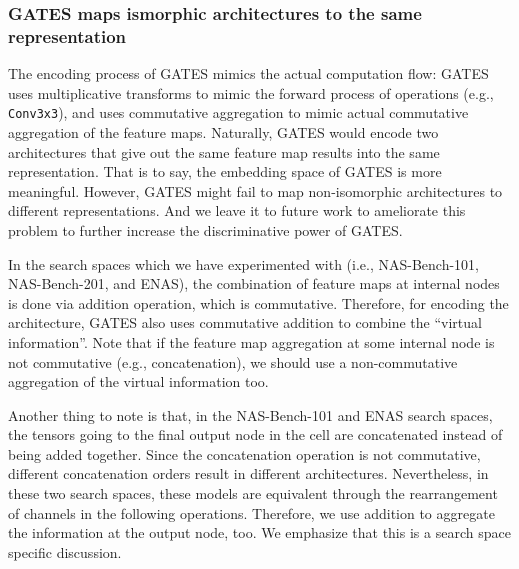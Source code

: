 \subsubsection{GATES maps ismorphic architectures to the same representation}
The encoding process of GATES mimics the actual computation flow: GATES uses multiplicative transforms to mimic the forward process of operations (e.g., \texttt{Conv3x3}), and uses commutative aggregation to mimic actual commutative aggregation of the feature maps.
Naturally, GATES would encode two architectures that give out the same feature map results into the same representation. That is to say, the embedding space of GATES is more meaningful. However, GATES might fail to map non-isomorphic architectures to different representations. And we leave it to future work to ameliorate this problem to further increase the discriminative power of GATES.

In the search spaces which we have experimented with (i.e., NAS-Bench-101, NAS-Bench-201, and ENAS), the combination of feature maps at internal nodes is done via addition operation, which is commutative. Therefore, for encoding the architecture, GATES also uses commutative addition to combine the ``virtual information''.
Note that if the feature map aggregation at some internal node is not commutative (e.g., concatenation), we should use a non-commutative aggregation of the virtual information too.

Another thing to note is that, in the NAS-Bench-101 and ENAS search spaces, the tensors going to the final output node in the cell are concatenated instead of being added together.
Since the concatenation operation is not commutative, different concatenation orders result in different architectures. Nevertheless, in these two search spaces, these models are equivalent through the rearrangement of channels in the following operations.
Therefore, we use addition to aggregate the information at the output node, too. We emphasize that this is a search space specific discussion.


